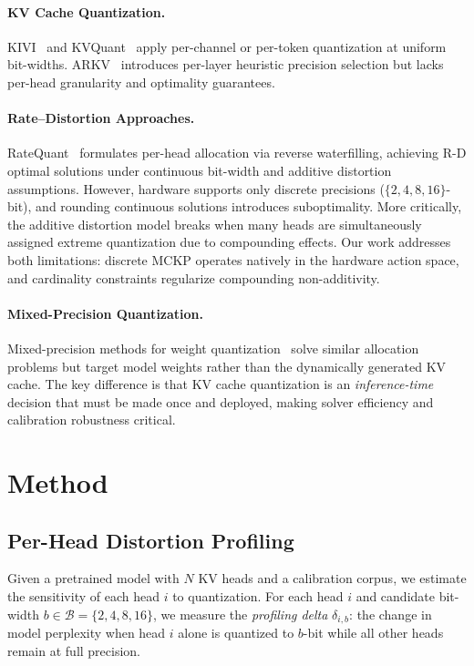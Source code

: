 \documentclass[11pt,a4paper]{article}
\begin{document}
\paragraph{KV Cache Quantization.}
KIVI~\cite{kivi2024} and KVQuant~\cite{kvquant2024} apply per-channel or per-token quantization at uniform bit-widths.
ARKV~\cite{arkv2026} introduces per-layer heuristic precision selection but lacks per-head granularity and optimality guarantees.

\paragraph{Rate--Distortion Approaches.}
RateQuant~\cite{ratequant2026} formulates per-head allocation via reverse waterfilling, achieving R-D optimal solutions under continuous bit-width and additive distortion assumptions.
However, hardware supports only discrete precisions ($\{2,4,8,16\}$-bit), and rounding continuous solutions introduces suboptimality.
More critically, the additive distortion model breaks when many heads are simultaneously assigned extreme quantization due to compounding effects.
Our work addresses both limitations: discrete MCKP operates natively in the hardware action space, and cardinality constraints regularize compounding non-additivity.

\paragraph{Mixed-Precision Quantization.}
Mixed-precision methods for weight quantization~\cite{haq2019,hawq2020} solve similar allocation problems but target model weights rather than the dynamically generated KV cache.
The key difference is that KV cache quantization is an \emph{inference-time} decision that must be made once and deployed, making solver efficiency and calibration robustness critical.

\section{Method}

\subsection{Per-Head Distortion Profiling}

Given a pretrained model with $N$ KV heads and a calibration corpus, we estimate the sensitivity of each head $i$ to quantization.
For each head $i$ and candidate bit-width $b \in \mathcal{B} = \{2, 4, 8, 16\}$, we measure the \emph{profiling delta} $\delta_{i,b}$: the change in model perplexity when head $i$ alone is quantized to $b$-bit while all other heads remain at full precision.
\end{document}
